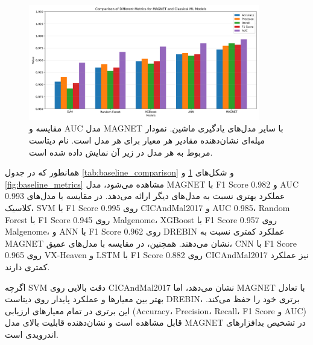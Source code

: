 \begin{figure}[h!]
    \centering
    \includegraphics[width=0.9\textwidth]{images/fig_baseline_metrics_comparison}
    \caption{مقایسه  و AUC مدل MAGNET با سایر مدل‌های یادگیری ماشین. نمودار میله‌ای نشان‌دهنده مقادیر هر معیار برای هر مدل است. نام دیتاست مربوط به هر مدل در زیر آن نمایش داده شده است.}
    \label{fig:baseline_comparison}
\end{figure}


همانطور که در جدول \ref{tab:baseline_comparison} و شکل‌های \ref{fig:baseline_comparison} و \ref{fig:baseline_metrics} مشاهده می‌شود، مدل MAGNET با F1 Score 0.982 و AUC 0.993 عملکرد بهتری نسبت به مدل‌های دیگر ارائه می‌دهد. در مقایسه با مدل‌های کلاسیک، SVM با F1 Score 0.995 روی CICAndMal2017 و AUC 0.985، Random Forest با F1 Score 0.945 روی Malgenome، XGBoost با F1 Score 0.957 روی Malgenome، و ANN با F1 Score 0.962 روی DREBIN عملکرد کمتری نسبت به MAGNET نشان می‌دهند. همچنین، در مقایسه با مدل‌های عمیق، CNN با F1 Score 0.965 روی VX-Heaven و LSTM با F1 Score 0.882 روی CICAndMal2017 نیز عملکرد کمتری دارند.

اگرچه SVM دقت بالایی روی CICAndMal2017 نشان می‌دهد، اما MAGNET با تعادل بهتر بین معیارها و عملکرد پایدار روی دیتاست DREBIN، برتری خود را حفظ می‌کند. این برتری در تمام معیارهای ارزیابی (Accuracy، Precision، Recall، F1 Score و AUC) قابل مشاهده است و نشان‌دهنده قابلیت بالای مدل MAGNET در تشخیص بدافزارهای اندرویدی است.

